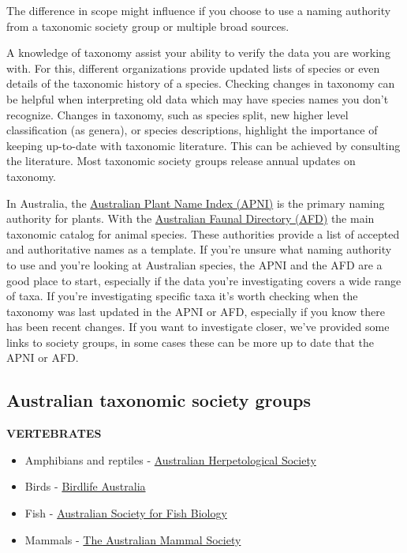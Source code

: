 \documentclass[
  letterpaper,
  DIV=11,
  numbers=noendperiod,
  oneside]{scrreprt}
\providecommand{\tightlist}{%
  \setlength{\itemsep}{0pt}\setlength{\parskip}{0pt}}\usepackage{longtable,booktabs,array}
\begin{document}
The difference in scope might influence if you choose to use a naming
authority from a taxonomic society group or multiple broad sources.

A knowledge of taxonomy assist your ability to verify the data you are
working with. For this, different organizations provide updated lists of
species or even details of the taxonomic history of a species. Checking
changes in taxonomy can be helpful when interpreting old data which may
have species names you don't recognize. Changes in taxonomy, such as
species split, new higher level classification (as genera), or species
descriptions, highlight the importance of keeping up-to-date with
taxonomic literature. This can be achieved by consulting the literature.
Most taxonomic society groups release annual updates on taxonomy.

In Australia, the \href{https://www.anbg.gov.au/apni/}{Australian Plant
Name Index (APNI)} is the primary naming authority for plants. With the
\href{https://biodiversity.org.au/afd/home}{Australian Faunal Directory
(AFD)} the main taxonomic catalog for animal species. These authorities
provide a list of accepted and authoritative names as a template. If
you're unsure what naming authority to use and you're looking at
Australian species, the APNI and the AFD are a good place to start,
especially if the data you're investigating covers a wide range of taxa.
If you're investigating specific taxa it's worth checking when the
taxonomy was last updated in the APNI or AFD, especially if you know
there has been recent changes. If you want to investigate closer, we've
provided some links to society groups, in some cases these can be more
up to date that the APNI or AFD.

\hypertarget{australian-taxonomic-society-groups}{%
\subsection{Australian taxonomic society
groups}\label{australian-taxonomic-society-groups}}

\textbf{VERTEBRATES}

\begin{itemize}
\tightlist
\item
  Amphibians and reptiles - \href{https://ahs.org.au/}{Australian
  Herpetological Society}\\
\item
  Birds - \href{https://www.birdlife.org.au/}{Birdlife Australia}\\
\item
  Fish - \href{https://www.asfb.org.au/}{Australian Society for Fish
  Biology}\\
\item
  Mammals - \href{https://australianmammals.org.au/}{The Australian
  Mammal Society}
\end{itemize}
\end{document}
